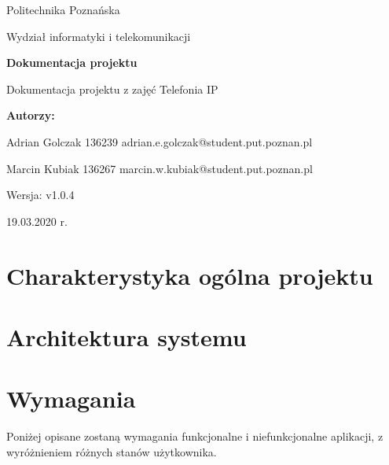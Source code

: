 \documentclass{article}
\newcommand{\version}{v1.0.4}
\begin{document}
\begin{titlepage}
		\begin{center}
			
						\LARGE
			Politechnika Poznańska
			
			\vspace{0.3cm}
			
			\large
			Wydział informatyki i telekomunikacji
			
			\vspace{3.0cm}
			\huge
			\textbf{Dokumentacja projektu}
			
			\vspace{0.5cm}
			
			\large
			Dokumentacja projektu z zajęć Telefonia IP
			
			\vspace{2.4cm}
			
			\LARGE
			\textbf{Autorzy:}
			
			\vspace{0.3cm}
			
			Adrian Golczak 136239
			adrian.e.golczak@student.put.poznan.pl
			
			\vspace{0.3cm}
			
			Marcin Kubiak 136267
			marcin.w.kubiak@student.put.poznan.pl
			
			\vfill
			
			\normalsize
			Wersja: \version
			
			\vspace{2cm}
			

			
			19.03.2020 r.
			
		\end{center}
\end{titlepage}
\tableofcontents
\newpage
	\section{Charakterystyka ogólna projektu}
	
	\section{Architektura systemu}
	
	\section{Wymagania}
	Poniżej opisane zostaną wymagania funkcjonalne i niefunkcjonalne aplikacji, z wyróżnieniem różnych stanów użytkownika.
\end{document}
